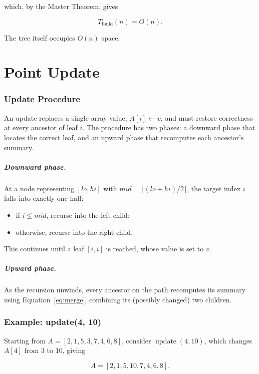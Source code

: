\documentclass[11pt,open=any,headings=option]{scrreprt}
\begin{document}
which, by the Master Theorem, gives

\begin{equation}
\boxed{T_{\text{build}}(n) = O(n)}.
\end{equation}

The tree itself occupies $O(n)$ space.

\chapter{Point Update}

\subsection{Update Procedure}
An update replaces a single array value, $A[i] \leftarrow v$, and must restore correctness at every ancestor of leaf $i$. The procedure has two phases: a downward phase that locates the correct leaf, and an upward phase that recomputes each ancestor's summary.

\paragraph{Downward phase.} At a node representing $[lo, hi]$ with $mid = \lfloor (lo+hi)/2 \rfloor$, the target index $i$ falls into exactly one half:
\begin{itemize}[nosep]
  \item if $i \le mid$, recurse into the left child;
  \item otherwise, recurse into the right child.
\end{itemize}
This continues until a leaf $[i,i]$ is reached, whose value is set to $v$.

\paragraph{Upward phase.} As the recursion unwinds, every ancestor on the path recomputes its summary using Equation~\eqref{eq:merge}, combining its (possibly changed) two children.

\subsection{Example: update(4, 10)}
Starting from $A = [2,1,5,3,7,4,6,8]$, consider $\operatorname{update}(4,10)$, which changes $A[4]$ from $3$ to $10$, giving

\begin{equation}
A = [2,1,5,10,7,4,6,8].
\end{equation}
\end{document}
